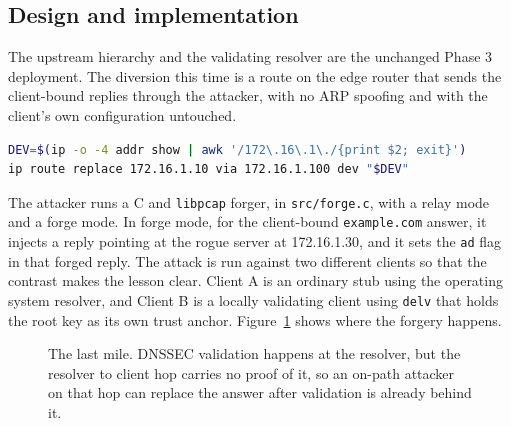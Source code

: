 \documentclass[11pt]{article}
\begin{document}
\subsection{Design and implementation}

The upstream hierarchy and the validating resolver are the unchanged Phase 3
deployment. The diversion this time is a route on the edge router that sends the
client-bound replies through the attacker, with no ARP spoofing and with the
client's own configuration untouched.

\begin{lstlisting}[language=bash,caption={The Phase 6 diversion on the edge router, detecting its interface by address (scripts/divert-on.sh).}]
DEV=$(ip -o -4 addr show | awk '/172\.16\.1\./{print $2; exit}')
ip route replace 172.16.1.10 via 172.16.1.100 dev "$DEV"
\end{lstlisting}

The attacker runs a C and \texttt{libpcap} forger, in \texttt{src/forge.c}, with a
relay mode and a forge mode. In forge mode, for the client-bound
\texttt{example.com} answer, it injects a reply pointing at the rogue server at
172.16.1.30, and it sets the \texttt{ad} flag in that forged reply. The attack is
run against two different clients so that the contrast makes the lesson clear.
Client A is an ordinary stub using the operating system resolver, and Client B is a
locally validating client using \texttt{delv} that holds the root key as its own
trust anchor. Figure~\ref{fig:p6-lastmile} shows where the forgery happens.

\begin{figure}[H]
\centering
{}
\caption{The last mile. DNSSEC validation happens at the resolver, but the resolver to client hop carries no proof of it, so an on-path attacker on that hop can replace the answer after validation is already behind it.}
\label{fig:p6-lastmile}
\end{figure}
\end{document}
